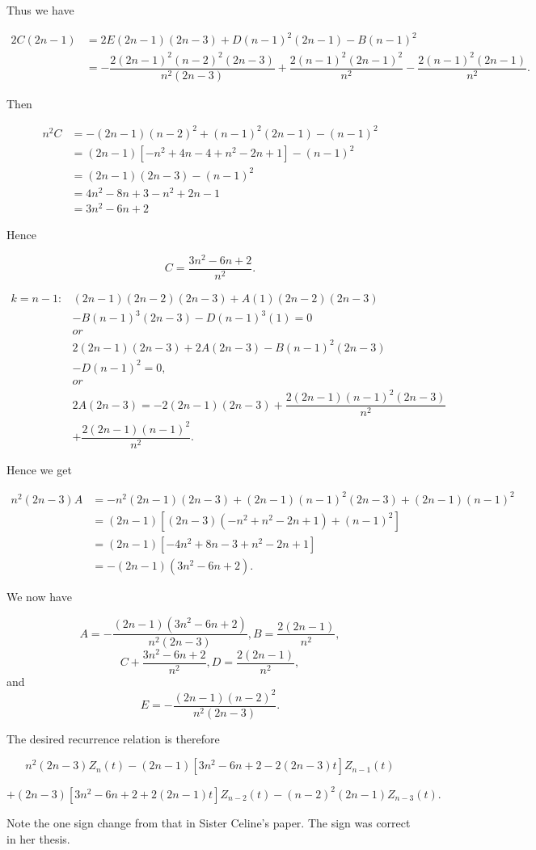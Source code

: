 \begin{solution}
Thus we have

$$\begin{array}{ll}
2C(2n-1) &= 2E(2n-1)(2n-3) + D(n-1)^2(2n-1) -B(n-1)^2 \\
&= -\dfrac{2(2n-1)^2(n-2)^2(2n-3)}{n^2(2n-3)} + \dfrac{2(n-1)^2(2n-1)^2}{n^2} - \dfrac{2(n-1)^2(2n-1)}{n^2}.
\end{array}$$

Then

$$\begin{array}{ll}
n^2C &= -(2n-1)(n-2)^2 + (n-1)^2(2n-1)-(n-1)^2 \\
&= (2n-1)[-n^2+4n-4+n^2-2n+1]-(n-1)^2 \\
&= (2n-1)(2n-3)-(n-1)^2 \\
&= 4n^2-8n+3-n^2+2n-1 \\
&= 3n^2-6n+2
\end{array}$$

Hence

$$C = \dfrac{3n^2-6n+2}{n^2}.$$

$$\begin{array}{ll}
k=n-1: & (2n-1)(2n-2)(2n-3)+A(1)(2n-2)(2n-3) \\
& -B(n-1)^3(2n-3)-D(n-1)^3(1)=0 \\
& or \\
& 2(2n-1)(2n-3) + 2A(2n-3) - B(n-1)^2(2n-3) \\
& -D(n-1)^2=0, \\
& or \\
& 2A(2n-3) = -2(2n-1)(2n-3) + \dfrac{2(2n-1)(n-1)^2(2n-3)}{n^2} \\
& + \dfrac{2(2n-1)(n-1)^2}{n^2}.
\end{array}$$

Hence we get

$$\begin{array}{ll}
n^2(2n-3)A &= -n^2(2n-1)(2n-3) + (2n-1)(n-1)^2(2n-3)+(2n-1)(n-1)^2 \\
&= (2n-1)[(2n-3)(-n^2+n^2-2n+1) + (n-1)^2 ] \\
&= (2n-1)[-4n^2+8n-3+n^2-2n+1] \\
&= -(2n-1)(3n^2-6n+2).
\end{array}$$

We now have

$$A = -\dfrac{(2n-1)(3n^2-6n+2)}{n^2(2n-3)}, B=\dfrac{2(2n-1)}{n^2},$$
$$C+\dfrac{3n^2-6n+2}{n^2}, D = \dfrac{2(2n-1)}{n^2},$$
and
$$E = -\dfrac{(2n-1)(n-2)^2}{n^2(2n-3)}.$$

The desired recurrence relation is therefore

$$n^2(2n-3)Z_n(t) - (2n-1) \left[ 3n^2-6n+2-2(2n-3)t \right] Z_{n-1}(t)$$

$$+(2n-3)[3n^2-6n+2+2(2n-1)t]Z_{n-2}(t) - (n-2)^2(2n-1)Z_{n-3}(t).$$


Note the one sign change from that in Sister Celine's paper. The sign was correct in her thesis.
\end{solution}
